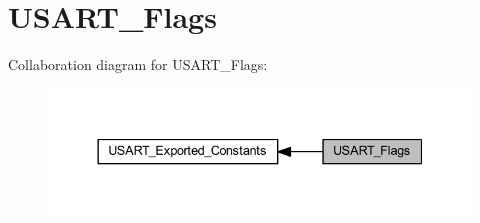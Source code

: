 \hypertarget{group___u_s_a_r_t___flags}{}\section{U\+S\+A\+R\+T\+\_\+\+Flags}
\label{group___u_s_a_r_t___flags}
Collaboration diagram for U\+S\+A\+R\+T\+\_\+\+Flags\+:
\nopagebreak
\begin{figure}[H]
\begin{center}
\leavevmode
\includegraphics[width=337pt]{group___u_s_a_r_t___flags}
\end{center}
\end{figure}
